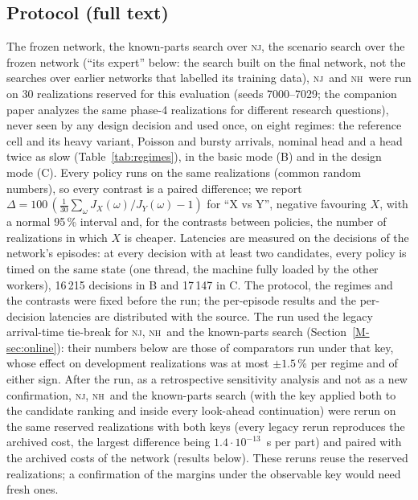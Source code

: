 \documentclass[11pt,a4paper]{article}
\theoremstyle{plain}
\theoremstyle{definition}
\theoremstyle{remark}
\newcommand{\nj}{\textsc{nj}}
\newcommand{\nh}{\textsc{nh}}
\newcommand{\tcross}{\tau_{\mathrm{cross}}}
\begin{document}
\subsection{Protocol (full text)}
The frozen network, the known-parts search over \nj, the scenario search over the
frozen network (``its expert'' below: the search built on the final network, not the
searches over earlier networks that labelled its training data), \nj\ and \nh\ were run on 30 realizations reserved for this
evaluation (seeds 7000--7029; the companion paper analyzes the same phase-4 realizations
for different research questions), never seen by any design decision and used once, on eight
regimes: the reference cell and its heavy variant, Poisson and bursty arrivals, nominal
head and a head twice as slow (Table~\ref{tab:regimes}), in the basic mode (B) and in the
design mode (C). Every policy runs on the same realizations (common random numbers), so
every contrast is a paired difference; we report $\Delta=100\,(\frac{1}{30}\sum_\omega
J_X(\omega)/J_Y(\omega)-1)$ for ``X vs Y'', negative favouring $X$, with a normal 95\,\%
interval and, for the contrasts between policies, the number of realizations in which $X$
is cheaper. Latencies are measured on the decisions of the network's episodes: at every
decision with at least two candidates, every policy is timed on the same state (one
thread, the machine fully loaded by the other workers), 16\,215 decisions in B and
17\,147 in C. The protocol, the regimes and the contrasts were fixed before the run; the
per-episode results and the per-decision latencies are distributed with the source.
The run used the legacy arrival-time tie-break for \nj, \nh\ and the known-parts search
(Section~\ref{M-sec:online}): their numbers below are those of comparators run under
that key, whose effect on development realizations was at most $\pm1.5$\,\% per
regime and of either sign. After the run, as a retrospective sensitivity analysis and
not as a new confirmation, \nj, \nh\ and the known-parts search (with the key applied
both to the candidate ranking and inside every look-ahead continuation) were rerun on the
same reserved realizations with both keys (every legacy rerun reproduces the archived
cost, the largest difference being $1.4\cdot10^{-13}$~s per part) and paired with the
archived costs of the network (results below). These reruns reuse the reserved
realizations; a confirmation of the margins under the observable key would need fresh
ones.

\begin{table}[t]
\centering\small
\caption{Regimes of the confirmatory evaluation and their physical scales ($\tcross$ is
the head's travel time across the conveyors); parts, penalized flow time, flow time,
blocking events and blocked conveyor-seconds are means per episode for \nj\ in B over the
30 realizations (seeds 7000--7029, the phase-4 realizations that the companion paper also
analyzes).}
\label{tab:regimes}
\resizebox{\linewidth}{!}{}
\end{table}
\end{document}

